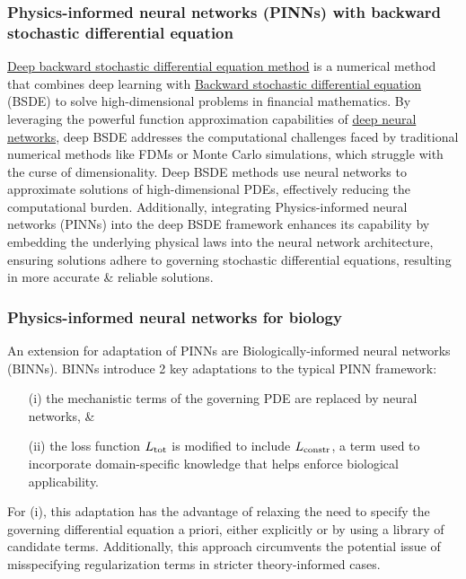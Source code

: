 \documentclass{article}
\begin{document}
\subsubsection{Physics-informed neural networks (PINNs) with backward stochastic differential equation}
\href{https://en.wikipedia.org/wiki/Deep_backward_stochastic_differential_equation_method}{Deep backward stochastic differential equation method} is a numerical method that combines deep learning with \href{https://en.wikipedia.org/wiki/Backward_stochastic_differential_equation}{Backward stochastic differential equation} (BSDE) to solve high-dimensional problems in financial mathematics. By leveraging the powerful function approximation capabilities of \href{https://en.wikipedia.org/wiki/Deep_neural_networks}{deep neural networks}, deep BSDE addresses the computational challenges faced by traditional numerical methods like FDMs or Monte Carlo simulations, which struggle with the curse of dimensionality. Deep BSDE methods use neural networks to approximate solutions of high-dimensional PDEs, effectively reducing the computational burden. Additionally, integrating Physics-informed neural networks (PINNs) into the deep BSDE framework enhances its capability by embedding the underlying physical laws into the neural network architecture, ensuring solutions adhere to governing stochastic differential equations, resulting in more accurate \& reliable solutions.

\subsubsection{Physics-informed neural networks for biology}
An extension for adaptation of PINNs are Biologically-informed neural networks (BINNs). BINNs introduce 2 key adaptations to the typical PINN framework:
\begin{itemize}
	\item[(i)] the mechanistic terms of the governing PDE are replaced by neural networks, \&
	\item[(ii)] the loss function $L_{\rm tot}$ is modified to include $L_{\rm constr}$, a term used to incorporate domain-specific knowledge that helps enforce biological applicability.
\end{itemize}
For (i), this adaptation has the advantage of relaxing the need to specify the governing differential equation a priori, either explicitly or by using a library of candidate terms. Additionally, this approach circumvents the potential issue of misspecifying regularization terms in stricter theory-informed cases.
\end{document}
